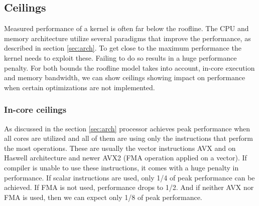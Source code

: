 \subsection{Ceilings}

Measured performance of a kernel is often far below the roofline. The CPU and memory architecture utilize several paradigms that improve the performance, as described in section \ref{sec:arch}. To get close to the maximum performance the kernel needs to exploit these. Failing to do so results in a huge performance penalty.
For both bounds the roofline model takes into account, in-core execution and memory bandwidth, we can show ceilings showing impact on performance when certain optimizations are not implemented.

\subsubsection*{In-core ceilings}


As discussed in the section \ref{sec:arch} processor achieves peak performance when all cores are utilized and all of them are using only the instructions that perform the most operations. These are usually the vector instructions AVX and on Haswell architecture and newer AVX2 (FMA operation applied on a vector).
If compiler is unable to use these instructions, it comes with a huge penalty in performance. If scalar instructions are used, only 1/4 of peak performance can be achieved. If FMA is not used, performance drops to 1/2. And if neither AVX nor FMA is used, then we can expect only 1/8 of peak performance.


